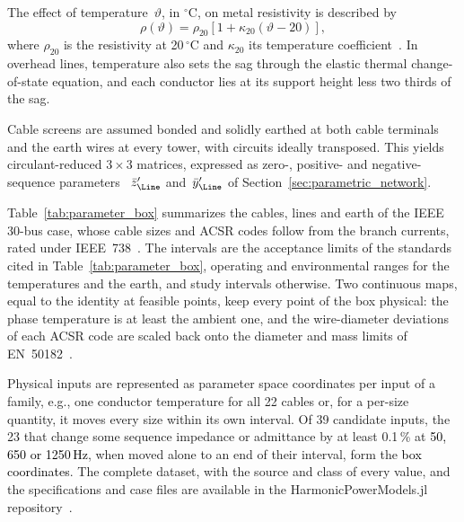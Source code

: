 The effect of temperature~$\vartheta$, in $^{\circ}$C, on metal resistivity is described by 
\begin{equation}
    \rho(\vartheta) = \rho_{20} \left[ 1 + \kappa_{20} \left( \vartheta - 20 \right) \right],
    \label{eq:resistivity_temperature}
\end{equation}
where $\rho_{20}$ is the resistivity at 20\,$^{\circ}$C and $\kappa_{20}$ its temperature coefficient~\cite{iec62641_2022,iec60287_1_1_2006}. In overhead lines, temperature also sets the sag through the elastic thermal change-of-state equation, and each conductor lies at its support height less two thirds of the sag.

Cable screens are assumed bonded and solidly earthed at both cable terminals and the earth wires at every tower, with circuits ideally transposed. This yields circulant-reduced $3 \times 3$ matrices, expressed as zero-, positive- and negative-sequence parameters ~$\bar{z}'_{\Line}$ and~$\bar{y}'_{\Line}$ of Section~\ref{sec:parametric_network}.

Table~\ref{tab:parameter_box} summarizes the cables, lines and earth of the IEEE 30-bus case, whose cable sizes and ACSR codes follow from the branch currents, rated under IEEE~738~\cite{ieee738_2023}. The intervals are the acceptance limits of the standards cited in Table~\ref{tab:parameter_box}, operating and environmental ranges for the temperatures and the earth, and study intervals otherwise. Two continuous maps, equal to the identity at feasible points, keep every point of the box physical: the phase temperature is at least the ambient one, and the wire-diameter deviations of each ACSR code are scaled back onto the diameter and mass limits of EN~50182~\cite{en50182_2001}.

Physical inputs are represented as parameter space coordinates per input of a family, e.g., one conductor temperature for all 22 cables or, for a per-size quantity, it moves every size within its own interval. Of 39 candidate inputs, the 23 that change some sequence impedance or admittance by at least 0.1\,\% at \textcolor{black}{50, 650 or 1250\,Hz}, when moved alone to an end of their interval, form the \textcolor{black}{box coordinates}. The complete dataset, with the source and class of every value, and the specifications and case files are available in the HarmonicPowerModels.jl repository~\cite{hpm_2026}.
